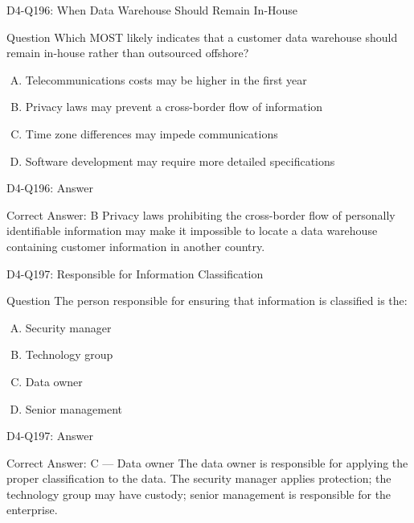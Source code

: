 \documentclass{beamer}
\begin{document}
	\begin{frame}{D4-Q196: When Data Warehouse Should Remain In-House}
		\begin{block}{Question}
			Which MOST likely indicates that a customer data warehouse should remain in-house rather than outsourced offshore?
		\end{block}
		\begin{enumerate}[(A)]
			\item Telecommunications costs may be higher in the first year
			\item Privacy laws may prevent a cross-border flow of information
			\item Time zone differences may impede communications
			\item Software development may require more detailed specifications
		\end{enumerate}
	\end{frame}
	\begin{frame}{D4-Q196: Answer}
		\begin{block}{Correct Answer: B}
			Privacy laws prohibiting the cross-border flow of personally identifiable information may make it impossible to locate a data warehouse containing customer information in another country.
		\end{block}
	\end{frame}
	
	\begin{frame}{D4-Q197: Responsible for Information Classification}
		\begin{block}{Question}
			The person responsible for ensuring that information is classified is the:
		\end{block}
		\begin{enumerate}[(A)]
			\item Security manager
			\item Technology group
			\item Data owner
			\item Senior management
		\end{enumerate}
	\end{frame}
	\begin{frame}{D4-Q197: Answer}
		\begin{block}{Correct Answer: C --- Data owner}
			The data owner is responsible for applying the proper classification to the data. The security manager applies protection; the technology group may have custody; senior management is responsible for the enterprise.
		\end{block}
	\end{frame}
	
\end{document}
